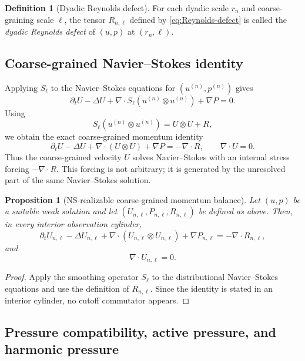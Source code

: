 \documentclass[11pt]{article}
\numberwithin{equation}{section}
\theoremstyle{plain}
\newtheorem{proposition}[theorem]{Proposition}
\theoremstyle{definition}
\newtheorem{definition}[theorem]{Definition}
\theoremstyle{remark}
\begin{document}
\begin{definition}[Dyadic Reynolds defect]
For each dyadic scale \(r_n\) and coarse-graining scale \(\ell\), the tensor \(R_{n,\ell}\) defined by \eqref{eq:Reynolds-defect} is called the \emph{dyadic Reynolds defect} of \((u,p)\) at \((r_n,\ell)\).
\end{definition}

\subsection{Coarse-grained Navier--Stokes identity}

Applying \(S_\ell\) to the Navier--Stokes equations for \((u^{(n)},p^{(n)})\) gives
\[
  \partial_t U-\Delta U+
  \nabla\cdot S_\ell(u^{(n)}\otimes u^{(n)})+
  \nabla P=0.
\]
Using
\[
  S_\ell(u^{(n)}\otimes u^{(n)})=U\otimes U+R,
\]
we obtain the exact coarse-grained momentum identity
\begin{equation}
  \partial_t U-\Delta U+
  \nabla\cdot(U\otimes U)+\nabla P
  =
  -\nabla\cdot R,
  \qquad
  \nabla\cdot U=0.
  \label{eq:coarse-momentum}
\end{equation}
Thus the coarse-grained velocity \(U\) solves Navier--Stokes with an internal stress forcing \(-\nabla\cdot R\).  This forcing is not arbitrary; it is generated by the unresolved part of the same Navier--Stokes solution.

\begin{proposition}[NS-realizable coarse-grained momentum balance]
Let \((u,p)\) be a suitable weak solution and let \((U_{n,\ell},P_{n,\ell},R_{n,\ell})\) be defined as above.  Then, in every interior observation cylinder,
\[
  \partial_t U_{n,\ell}
  -\Delta U_{n,\ell}
  +\nabla\cdot(U_{n,\ell}\otimes U_{n,\ell})
  +\nabla P_{n,\ell}
  =
  -\nabla\cdot R_{n,\ell},
\]
and
\[
  \nabla\cdot U_{n,\ell}=0.
\]
\end{proposition}

\begin{proof}
Apply the smoothing operator \(S_\ell\) to the distributional Navier--Stokes equations and use the definition of \(R_{n,\ell}\).  Since the identity is stated in an interior cylinder, no cutoff commutator appears.
\end{proof}


\subsection{Pressure compatibility, active pressure, and harmonic pressure}
\end{document}
